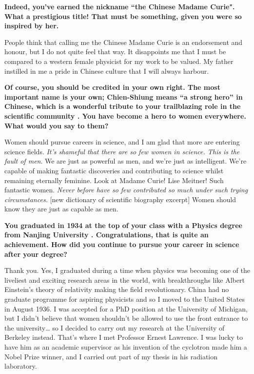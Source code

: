 \documentclass{article}
\newcommand{\q}[1]{\vspace{10pt}
\textbf{#1}
\vspace{0pt}}
\begin{document}
\begin{multicols}{2}
\q{Indeed, you’ve earned the nickname “the Chinese Madame Curie"\cite{L1}. What a prestigious title! That must be something, given you were so inspired by her.}


People think that calling me the Chinese Madame Curie is an endorsement and honour, but I do not quite feel that way\cite{L5}. It disappoints me that I must be compared to a western female physicist for my work to be valued. My father instilled in me a pride in Chinese culture that I will always harbour.

\q{Of course, you should be credited in your own right. The most important name is your own; Chien-Shiung means “a strong hero” in Chinese, which is a wonderful tribute to your trailblazing role in the scientific community \cite{L6}. You have become a hero to women everywhere. What would you say to them?}

Women should pursue careers in science, and I am glad that more are entering science fields. \textit{It’s shameful that there are so few women in science. This is the fault of men}\cite{N1}. We are just as powerful as men, and we’re just as intelligent. We’re capable of making fantastic discoveries and contributing to science whilst remaining eternally feminine. Look at Madame Curie! Lise Meitner! Such fantastic women. \textit{Never before have so few contributed so much under such trying circumstances.} [new dictionary of scientific biography excerpt] Women should know they are just as capable as men.

\q{You graduated in 1934 at the top of your class with a Physics degree from Nanjing University \cite{L7}. Congratulations, that is quite an achievement. How did you continue to pursue your career in science after your degree?}

Thank you. Yes, I graduated during a time when physics was becoming one of the liveliest and exciting research areas in the world, with breakthroughs like Albert Einstein’s theory of relativity making the field revolutionary. China had no graduate programme for aspiring physicists and so I moved to the United States in August 1936. I was accepted for a PhD position at the University of Michigan, but I didn’t believe that women shouldn’t be allowed to use the front entrance to the university… so I decided to carry out my research at the University of Berkeley instead. That’s where I met Professor Ernest Lawrence. I was lucky to have him as an academic supervisor as his invention of the cyclotron made him a Nobel Prize winner, and I carried out part of my thesis in his radiation laboratory. \cite{L5}


\end{multicols}
\end{document}
